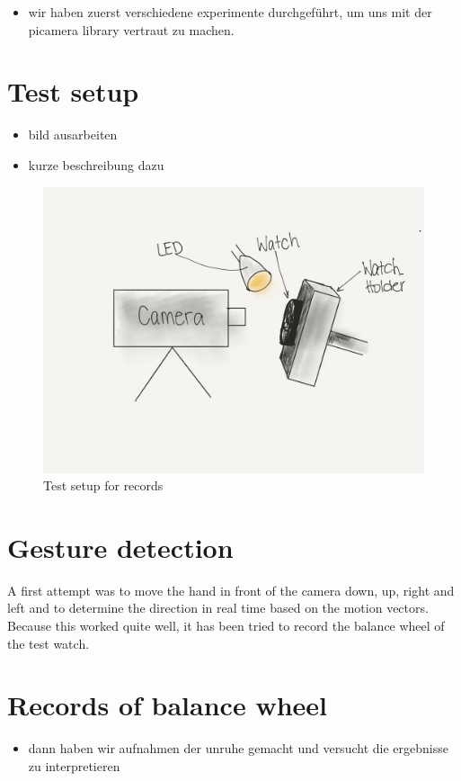 \documentclass[12pt, a4paper]{report}
\begin{document}
    \begin{itemize}
      \item wir haben zuerst verschiedene experimente durchgeführt, um uns mit der picamera library vertraut zu machen.       
    \end{itemize}

   \section{Test setup}
    \begin{itemize}
        \item bild ausarbeiten
        \item kurze beschreibung dazu
      \end{itemize}
      \begin{figure}[H]
        \centering
        \includegraphics[scale=0.1]{Images/test_setup}
        
        \caption{Test setup for records}
        \end{figure}
    \section{Gesture detection}
    A first attempt was to move the hand in front of the camera down, up, right and left and to determine the direction in real time based on the motion vectors.
    Because this worked quite well, it has been tried to record the balance wheel of the test watch.

    \section{Records of balance wheel}
    \begin{itemize}
        \item dann haben wir aufnahmen der unruhe gemacht und versucht die ergebnisse zu interpretieren
    \end{itemize}
    
\end{document}
